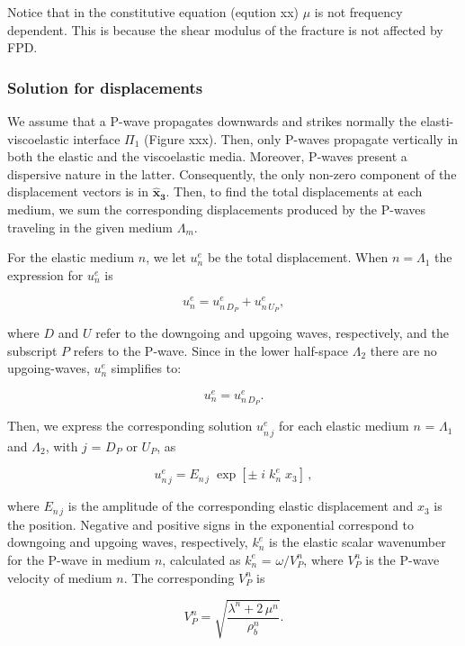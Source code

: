 \documentclass[draft]{agujournal2019}
\begin{document}
Notice that in the constitutive equation (eqution xx) $\mu$ is not frequency dependent. This is because the shear modulus of the fracture is not affected by FPD. 

\subsubsection{Solution for displacements}
We assume that a P-wave propagates downwards and strikes normally the elasti-viscoelastic interface $\Pi_1$ (Figure xxx). 
Then, only P-waves propagate vertically in both the elastic and the viscoelastic media. Moreover, P-waves present a dispersive nature in the latter.
Consequently, the only non-zero component of the displacement vectors is in $\bm{\hat x_3}$.
Then, to find the total displacements at each medium, we sum the corresponding displacements produced by the P-waves traveling in the given medium $\Lambda_m$.

For the elastic medium $n$, we let $u_n^e$ be the total displacement. When $n=\Lambda_1$ the expression for $u_n^e$ is
\begin{linenomath*}
\begin{equation}\label{Eq.8}
u_n^e=  u_{n\,{D_P}}^e + u_{n\,{U_P}}^e, 
\end{equation}
\end{linenomath*}
where $D$ and $U$ refer to the downgoing and upgoing waves, respectively, and the subscript $P$ refers to the P-wave. Since in the lower half-space $\Lambda_2$ there are no upgoing-waves, $u_n^e$ simplifies to:
\begin{linenomath*}
\begin{equation}\label{Eq.8.1}
u_n^e = u_{n\,{D_P}}^e.
\end{equation}
\end{linenomath*}

Then, we express the corresponding solution $u_{n\,j}^e$ for each elastic medium $n$ = $\Lambda_1$ and $\Lambda_2$, with $j$ = $D_P$ or $U_P$, as
\begin{linenomath*}
\begin{equation}\label{Eq.10}
u_{n\,j}^e = E_{n \,j} \;\exp[ \pm\; i \; k_{n}^e \; x_3 ]\,,
\end{equation}
\end{linenomath*}
where $E_{n \,j}$ is the amplitude of the corresponding elastic displacement and $x_3$ is the position. Negative and positive signs in the exponential correspond to downgoing and upgoing waves, respectively, $ k_{n}^e$ is the elastic scalar wavenumber for the P-wave in medium $n$, calculated as $ k_{n}^e$ = $\omega / V_P^n$, where $V_P^n$ is the P-wave velocity of medium $n$. 
The corresponding $V_P^n$ is
\begin{linenomath*}
\begin{equation}\label{Eq.12}
V_P^n = \sqrt{\frac{\lambda^n +  2\, \mu^n}{\rho_b^n}}.
\end{equation}
\end{linenomath*}
\end{document}
